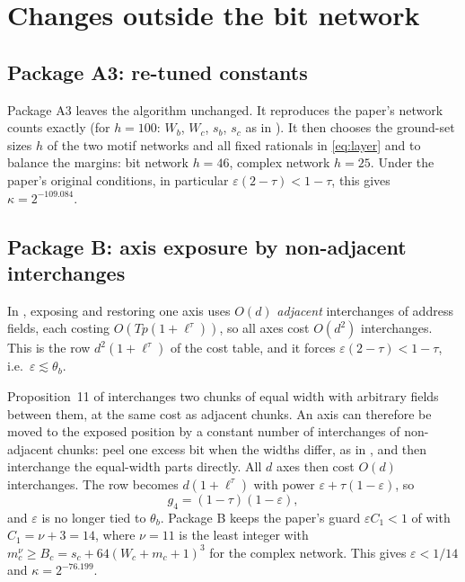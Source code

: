 \section{Changes outside the bit network}\label{sec:outside}

\subsection{Package A3: re-tuned constants}
Package A3 leaves the algorithm unchanged. It reproduces the paper's network counts exactly (for $h=100$: $W_b$, $W_c$, $s_b$, $s_c$ as in \cite[\S3]{OAI}). It then chooses the ground-set sizes $h$ of the two motif networks and all fixed rationals in \eqref{eq:layer} and \cite[\S9.1]{OAI} to balance the margins: bit network $h=46$, complex network $h=25$. Under the paper's original conditions, in particular $\varepsilon(2-\tau) < 1-\tau$, this gives $\kappa = 2^{-109.084}$.

\subsection{Package B: axis exposure by non-adjacent interchanges}
In \cite[\S8]{OAI}, exposing and restoring one axis uses $O(d)$ \emph{adjacent} interchanges of address fields, each costing $O(Tp(1+\ell^\tau))$, so all axes cost $O(d^2)$ interchanges. This is the row $d^2(1+\ell^\tau)$ of the cost table, and it forces $\varepsilon(2-\tau) < 1-\tau$, i.e.\ $\varepsilon \lesssim \theta_b$.

Proposition~11 of \cite{OAI} interchanges two chunks of equal width with arbitrary fields between them, at the same cost as adjacent chunks. An axis can therefore be moved to the exposed position by a constant number of interchanges of non-adjacent chunks: peel one excess bit when the widths differ, as in \cite[\S8]{OAI}, and then interchange the equal-width parts directly. All $d$ axes then cost $O(d)$ interchanges. The row becomes $d(1+\ell^\tau)$ with power $\varepsilon + \tau(1-\varepsilon)$, so
\[
g_4 = (1-\tau)(1-\varepsilon),
\]
and $\varepsilon$ is no longer tied to $\theta_b$. Package B keeps the paper's guard $\varepsilon C_1 < 1$ of \cite[Prop.~14]{OAI} with $C_1 = \nu + 3 = 14$, where $\nu = 11$ is the least integer with $m_c^\nu \ge B_c = s_c + 64(W_c + m_c + 1)^3$ for the complex network. This gives $\varepsilon < 1/14$ and $\kappa = 2^{-76.199}$.


